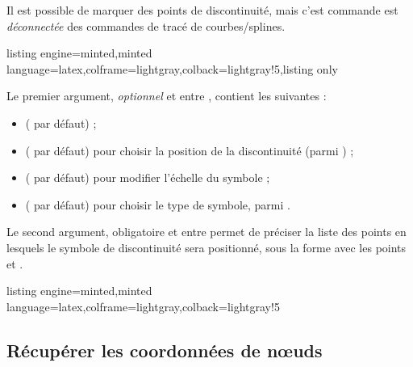 \documentclass[11pt,a4paper]{ltxdoc}
\begin{document}
Il est possible de marquer des points de discontinuité, mais c'est commande est \textit{déconnectée} des commandes de tracé de courbes/splines.

\begin{tcblisting}{listing engine=minted,minted language=latex,colframe=lightgray,colback=lightgray!5,listing only}
\end{tcblisting}

Le premier argument, \textit{optionnel} et entre \MontreCode{[...]}, contient les  suivantes :

\begin{itemize}
  \item {} ( par défaut) ;
  \item {} ( par défaut) pour choisir la position de la discontinuité (parmi ) ;
  \item {} ( par défaut) pour modifier l'échelle du symbole ;
  \item {} ( par défaut) pour choisir le type de symbole, parmi .
\end{itemize}

Le second argument, obligatoire et entre  permet de préciser la liste des points en lesquels le symbole de discontinuité sera positionné, sous la forme  avec les points  et .

\begin{tcblisting}{listing engine=minted,minted language=latex,colframe=lightgray,colback=lightgray!5}
\begin{GraphiqueTikz}[x=1cm,y=1cm,Xmin=0,Xmax=10,Ymin=0,Ymax=5]
\end{GraphiqueTikz}
\end{tcblisting}

\subsection{Récupérer les coordonnées de nœuds}\label{recupcoordo}
\end{document}
